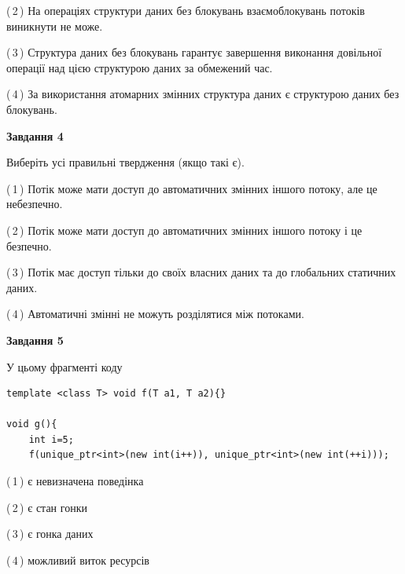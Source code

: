 \documentclass[12pt, ukrainian]{article}
\begin{document}
\begin {large}
{(\,2\,) На операціях структури даних без блокувань взаємоблокувань потоків виникнути не може.%

(\,3\,) Структура даних без блокувань гарантує завершення виконання довільної операції над цією структурою даних за обмежений час.%

(\,4\,) За використання атомарних змінних структура даних є структурою даних без блокувань.%



\begin{center}
\textbf{Завдання 4}
\end{center}
Виберіть усі правильні твердження (якщо такі є).\par
\vspace{2mm}

(\,1\,) Потік може мати доступ до автоматичних змінних іншого потоку, але це небезпечно.%

(\,2\,) Потік може мати доступ до автоматичних змінних іншого потоку і це безпечно.%

(\,3\,) Потік має доступ тільки до своїх власних даних та до глобальних статичних даних.%

(\,4\,) Автоматичні змінні не можуть розділятися між потоками.%



\begin{center}
\textbf{Завдання 5}
\end{center}
У цьому фрагменті коду
\begin{verbatim}
template <class T> void f(T a1, T a2){}

void g(){
    int i=5;
    f(unique_ptr<int>(new int(i++)), unique_ptr<int>(new int(++i)));
\end{verbatim}

(\,1\,) є невизначена поведінка%

(\,2\,) є стан гонки%

(\,3\,) є гонка даних%

(\,4\,) можливий виток ресурсів%


}
\end {large}
\end{document}

